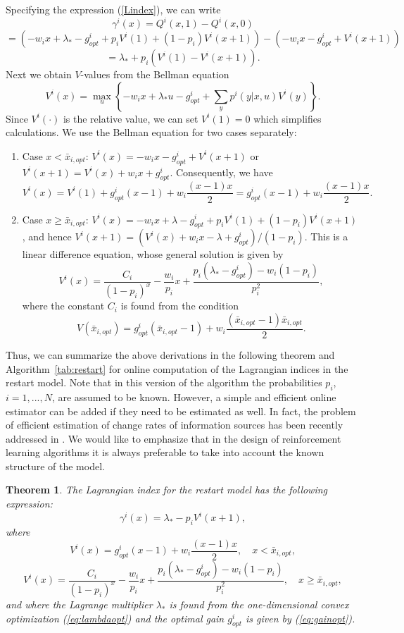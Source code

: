 \documentclass[12pt]{article}
\newtheorem{theorem}{Theorem}[section]
\numberwithin{equation}{section}
\newcommand{\1}{\textbf{1}}
\begin{document}
Specifying the expression (\ref{Lindex}), we can write
$$
\gamma^i(x) = Q^i(x,1) - Q^i(x,0)
$$
$$
=\left(-w_i x + \lambda_* - g^i_{opt} + p_i V^i(1) + (1-p_i) V^i(x+1)\right) - \left(-w_i x - g^i_{opt} + V^i(x+1)\right)
$$
$$
=\lambda_* + p_i\left(V^i(1)-V^i(x+1)\right).
$$
Next we obtain $V$-values from the Bellman equation
$$
V^i(x) = \max_u \left\{ -w_i x + \lambda_* u - g^i_{opt} + \sum_y p^i(y|x,u) V^i(y) \right\}.
$$
Since $V^i(\cdot)$ is the relative value, we can set $V^i(1)=0$ which simplifies calculations. 
We use the Bellman equation for two cases separately:
\begin{enumerate}
\item Case $x < \bar{x}_{i,opt}$: $V^i(x) = -w_ix -g^i_{opt} + V^i(x+1)$ or $V^i(x+1)=V^i(x)+w_i x +g^i_{opt}$.
Consequently, we have
$$
V^i(x) = V^i(1) + g^i_{opt} (x-1) + w_i \frac{(x-1)x}{2} = g^i_{opt} (x-1) + w_i \frac{(x-1)x}{2}.
$$
\item Case $x \ge \bar{x}_{i,opt}$: $V^i(x) = -w_ix +\lambda -g^i_{opt} +p_i V^i(1)+(1-p_i)V^i(x+1)$, and hence
$V^i(x+1) = (V^i(x) + w_ix -\lambda +g^i_{opt})/(1-p_i)$. This is a linear difference equation,
whose general solution is given by
$$
V^i(x) = \frac{C_i}{(1-p_i)^x} -\frac{w_i}{p_i}x +\frac{p_i(\lambda_*-g^i_{opt})-w_i(1-p_i)}{p_i^2},
$$
where the constant $C_i$ is found from the condition 
$$
V(\bar{x}_{i,opt}) = g^i_{opt} (\bar{x}_{i,opt}-1) + w_i \frac{(\bar{x}_{i,opt}-1)\bar{x}_{i,opt}}{2}.
$$
\end{enumerate}
Thus, we can summarize the above derivations in the following theorem and Algorithm~\ref{tab:restart}
for online computation of the Lagrangian indices in the restart model. Note that in this version of the
algorithm the probabilities $p_i$, $i=1,...,N$, are assumed to be known. However, a simple and efficient online
estimator can be added if they need to be estimated as well. In fact, the problem of efficient estimation 
of change rates of information sources has been recently addressed in \cite{Gugan1,Gugan2}. 
We would like to emphasize that in the design of reinforcement learning algorithms it is
always preferable to take into account the known structure of the model.
\begin{theorem}
\label{thm:LIrestart}
The Lagrangian index for the restart model has the following expression:
$$
\gamma^i(x) = \lambda_* - p_i V^i(x+1),
$$
where
$$
V^i(x) = g^i_{opt} (x-1) + w_i \frac{(x-1)x}{2}, \quad x < \bar{x}_{i,opt},
$$
$$
V^i(x) = \frac{C_i}{(1-p_i)^x} -\frac{w_i}{p_i}x +\frac{p_i(\lambda_*-g^i_{opt})-w_i(1-p_i)}{p_i^2},
\quad x \ge \bar{x}_{i,opt},
$$
and where the Lagrange multiplier $\lambda_*$ is found from the 
one-dimensional convex optimization (\ref{eq:lambdaopt}) and 
the optimal gain $g^i_{opt}$ is given by (\ref{eq:gainopt}).
\end{theorem}
\end{document}
